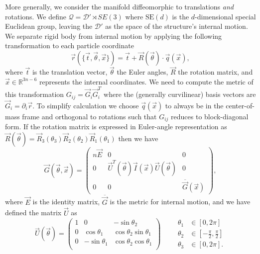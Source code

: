 \documentclass[11pt,twoside]{report}
\begin{document}
More generally, we consider the manifold diffeomorphic to translations \emph{and} rotations.
We define $\mathcal{Q} = \mathcal{D}' \rtimes SE(3)$ where $\textrm{SE}(d)$ is the $d$-dimensional special Euclidean group, leaving the $\mathcal{D}'$ as the space of the structure's internal motion.
We separate rigid body from internal motion by applying the following transformation to each particle coordinate
\begin{equation}
  \vec{r}(\{\vec{t}, \vec{\theta}, \vec{x}\}) =
  \vec{t} + \vec{R}(\vec{\theta}) \cdot \vec{q}(\vec{x}),
\end{equation}
where $\vec{t}$ is the translation vector, $\vec{\theta}$ the Euler angles, $\vec{R}$ the rotation matrix, and $\vec{x} \in \mathbb{R}^{3n-6}$ represents the internal coordinates.
We need to compute the metric of this transformation $G_{ij} = \vec{G}_i \vec{G}_i^T$ where the (generally curvilinear) basis vectors are $\vec{G}_i = \partial_i \vec{r}$.
To simplify calculation we choose $\vec{q}(\vec{x})$ to always be in the center-of-mass frame and orthogonal to rotations such that $G_{ij}$ reduces to block-diagonal form.
If the rotation matrix is expressed in Euler-angle representation as $\vec{R}(\vec{\theta}) = \vec{R}_3(\theta_3) \vec{R}_2(\theta_2) \vec{R}_1(\theta_1)$ then we have%
\begin{equation}
  \vec{G}(\vec{\theta}, \vec{x}) =
  \begin{pmatrix}
    n \vec{E} & 0 & 0 \\
    0 & \vec{U}^T(\vec{\theta}) \vec{I}(\vec{x}) \vec{U}(\vec{\theta}) & 0 \\
    0 & 0 & \overline{\vec{G}}(\vec{x})
  \end{pmatrix},
\end{equation}
where $\vec{E}$ is the identity matrix, $\overline{\vec{G}}$ is the metric for internal motion, and we have defined the matrix $\vec{U}$ as
\begin{equation}
  \vec{U}(\vec{\theta}) =
  \begin{pmatrix}
    1 &  0              & -\sin{\theta_2} \\
    0 &  \cos{\theta_1} &  \cos{\theta_2} \sin{\theta_1} \\
    0 & -\sin{\theta_1} &  \cos{\theta_2} \cos{\theta_1} \\
  \end{pmatrix}
  \qquad
  \begin{aligned}
    \theta_1 &\in [0,2\pi] \\
    \theta_2 &\in \left[-\frac{\pi}{2},\frac{\pi}{2}\right] \\
    \theta_3 &\in [0,2\pi].
  \end{aligned}
\end{equation}
\end{document}
